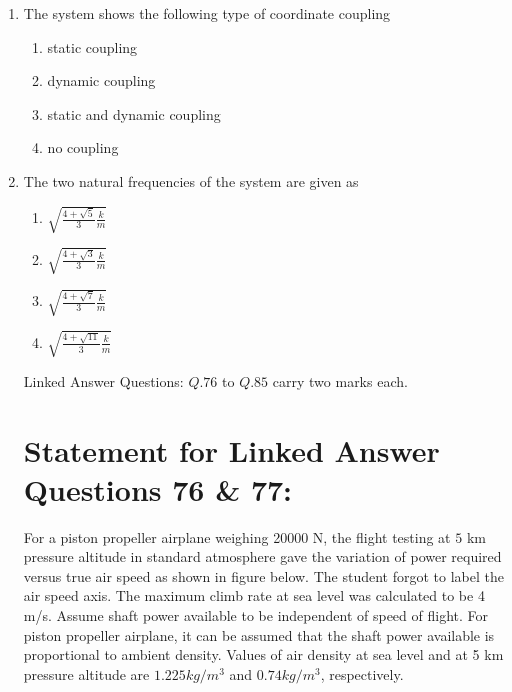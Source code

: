 \documentclass[journal]{IEEEtran}
\begin{document}
\begin{enumerate}

\item The system shows the following type of coordinate coupling
\begin{enumerate}
    \item static coupling
    \item dynamic coupling
    \item static and dynamic coupling
    \item no coupling\\
\end{enumerate}
\item The two natural frequencies of the system are given as
\begin{enumerate}
    \item $\sqrt{\frac{4+\sqrt{5}}{3}\frac{k}{m}}$
    \item $\sqrt{\frac{4+\sqrt{3}}{3}\frac{k}{m}}$
    \item $\sqrt{\frac{4+\sqrt{7}}{3}\frac{k}{m}}$
    \item $\sqrt{\frac{4+\sqrt{11}}{3}\frac{k}{m}}$
\end{enumerate}
Linked Answer Questions: $Q.76$ to $Q.85$ carry two marks each.
\section*{Statement for Linked Answer Questions 76 \& 77:}
For a piston propeller airplane weighing 20000 N, the flight testing at $5$ km pressure altitude in standard atmosphere gave the variation of power required versus true air speed as shown in figure below. The student forgot to label the air speed axis. The maximum climb rate at sea level was calculated to be 4 m/s. Assume shaft power available to be independent of speed of flight. For piston propeller airplane, it can be assumed that the shaft power available is proportional to ambient density. Values of air density at sea level and at 5 km pressure altitude are $1.225 kg/m^3$ and $0.74 kg/m^3$, respectively.




\end{enumerate}
\end{document}
